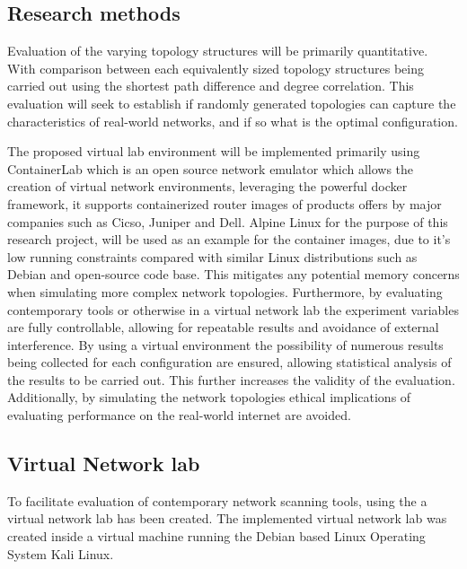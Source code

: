\subsection{Research methods}
Evaluation of the varying topology structures will be primarily quantitative. With comparison between each equivalently sized topology structures being carried out using the shortest path difference and degree correlation. This evaluation will seek to establish if randomly generated topologies can capture the characteristics of real-world networks, and if so what is the optimal configuration. 

The proposed virtual lab environment will be implemented primarily using ContainerLab \cite{containerlab} which is an open source network emulator which allows the creation of virtual network environments, leveraging the powerful docker framework, it supports containerized router images of products offers by major companies such as Cicso, Juniper and Dell. Alpine Linux for the purpose of this research project, will be used as an example for the container images, due to it's low running constraints compared with similar Linux distributions such as Debian\cite{alpine} and open-source code base. This mitigates any potential memory concerns when simulating more complex network topologies. Furthermore, by evaluating contemporary tools or otherwise in a virtual network lab the experiment variables are fully controllable, allowing for repeatable results and avoidance of external interference. By using a virtual environment the possibility of numerous results being collected for each configuration are ensured, allowing statistical analysis of the results to be carried out. This further increases the validity of the evaluation. Additionally, by simulating the network topologies ethical implications of evaluating performance on the real-world internet are avoided. 



\subsection{Virtual Network lab}
To facilitate evaluation of contemporary network scanning tools, using the a virtual network lab has been created. The implemented virtual network lab was created inside a virtual machine running the Debian based Linux Operating System  Kali Linux. 

